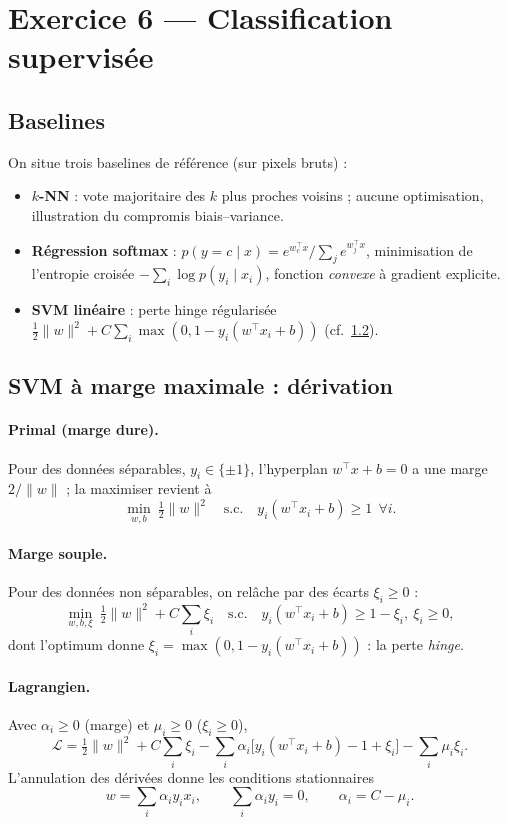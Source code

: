\documentclass[11pt,a4paper]{article}
\newcommand{\norm}[1]{\lVert #1 \rVert}
\newcommand{\T}{^{\top}}
\begin{document}
\section{Exercice 6 — Classification supervisée}

\subsection{Baselines}
On situe trois baselines de référence (sur pixels bruts) :
\begin{itemize}\itemsep2pt
  \item \textbf{$k$-NN} : vote majoritaire des $k$ plus proches voisins ; aucune
  optimisation, illustration du compromis biais–variance.
  \item \textbf{Régression softmax} : $p(y=c\mid x)=e^{w_c\T x}/\sum_j e^{w_j\T x}$,
  minimisation de l'entropie croisée $-\sum_i\log p(y_i\mid x_i)$, fonction
  \emph{convexe} à gradient explicite.
  \item \textbf{SVM linéaire} : perte hinge régularisée
  $\tfrac12\norm{w}^2+C\sum_i\max(0,1-y_i(w\T x_i+b))$ (cf.~\ref{sec:svm}).
\end{itemize}

\subsection{SVM à marge maximale : dérivation}\label{sec:svm}
\paragraph{Primal (marge dure).} Pour des données séparables, $y_i\in\{\pm1\}$,
l'hyperplan $w\T x+b=0$ a une marge $2/\norm{w}$ ; la maximiser revient à
\begin{equation}
\min_{w,b}\ \tfrac12\norm{w}^2
\quad\text{s.c.}\quad y_i(w\T x_i+b)\ge 1 \ \ \forall i .
\end{equation}
\paragraph{Marge souple.} Pour des données non séparables, on relâche par des
écarts $\xi_i\ge0$ :
\begin{equation}
\min_{w,b,\xi}\ \tfrac12\norm{w}^2 + C\sum_i\xi_i
\quad\text{s.c.}\quad y_i(w\T x_i+b)\ge 1-\xi_i,\ \xi_i\ge0 ,
\end{equation}
dont l'optimum donne $\xi_i=\max(0,1-y_i(w\T x_i+b))$ : la perte \emph{hinge}.
\paragraph{Lagrangien.} Avec $\alpha_i\ge0$ (marge) et $\mu_i\ge0$ ($\xi_i\ge0$),
\[
\mathcal L=\tfrac12\norm{w}^2+C\sum_i\xi_i
-\sum_i\alpha_i\big[y_i(w\T x_i+b)-1+\xi_i\big]-\sum_i\mu_i\xi_i .
\]
L'annulation des dérivées donne les conditions stationnaires
\begin{equation}
w=\sum_i\alpha_i y_i x_i,\qquad
\sum_i\alpha_i y_i=0,\qquad
\alpha_i = C-\mu_i .
\end{equation}
\end{document}
